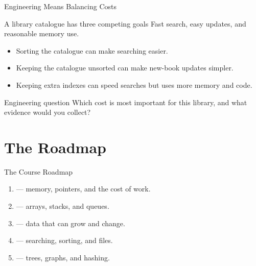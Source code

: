 \documentclass[aspectratio=169]{beamer}
\begin{document}
\begin{frame}{Engineering Means Balancing Costs}
  \begin{block}{A library catalogue has three competing goals}
    Fast search, easy updates, and reasonable memory use.
  \end{block}
  \begin{itemize}
    \item Sorting the catalogue can make searching easier.
    \item Keeping the catalogue unsorted can make new-book updates simpler.
    \item Keeping extra indexes can speed searches but uses more memory and code.
  \end{itemize}
  \begin{exampleblock}{Engineering question}
    Which cost is most important for this library, and what evidence would you collect?
  \end{exampleblock}
\end{frame}

\section{The Roadmap}

\begin{frame}{The Course Roadmap}
  \begin{enumerate}
    \item {} --- memory, pointers, and the cost of work.
    \item {} --- arrays, stacks, and queues.
    \item {} --- data that can grow and change.
    \item {} --- searching, sorting, and files.
    \item {} --- trees, graphs, and hashing.
  \end{enumerate}
  \vspace{0.15cm}
\end{frame}
\end{document}
